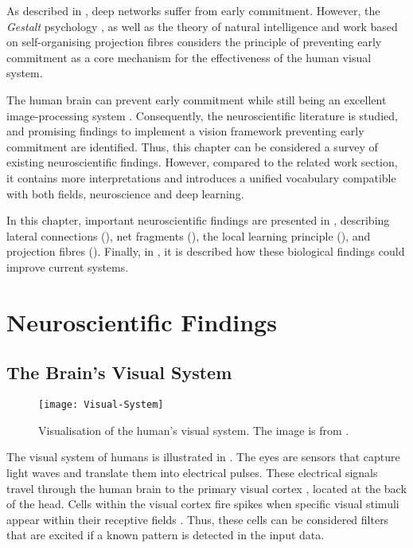 As described in , deep networks suffer from early commitment.
However, the \emph{Gestalt} psychology \cite{ellis_source_1938, kohler_gestalt_1992, wagemans_century_2012, hamlyn_psychology_2017}, as well as the theory of natural intelligence \cite{von_der_malsburg_theory_2022} and work based on self-organising projection fibres \cite{bienenstock_neural_1987, lades_distortion_1993, wiskott_face_1996, fernandes_self-organization_2015} considers the principle of preventing early commitment as a core mechanism for the effectiveness of the human visual system.

The human brain can prevent early commitment \cite{marr_vision_2010} while still being an excellent image-processing system \cite{ellis_source_1938, kohler_gestalt_1992, wagemans_century_2012, hamlyn_psychology_2017}. 
Consequently, the neuroscientific literature is studied, and promising findings to implement a vision framework preventing early commitment are identified.
Thus, this chapter can be considered a survey of existing neuroscientific findings.
However, compared to the related work section, it contains more interpretations and introduces a unified vocabulary compatible with both fields, neuroscience and deep learning.

In this chapter, important neuroscientific findings are presented in , describing lateral connections (), net fragments (), the local learning principle (), and projection fibres ().
Finally, in , it is described how these biological findings could improve current systems.



\section{Neuroscientific Findings}

\subsection{The Brain's Visual System}
\begin{figure}[h]
    \centering
    \texttt{[image: Visual-System]}
    \caption[Visualisation of the human's visual system]{Visualisation of the human's visual system. The image is from .}
\end{figure}
%
The visual system of humans is illustrated in . The eyes are sensors that capture light waves and translate them into electrical pulses. These electrical signals travel through the human brain to the primary visual cortex , located at the back of the head.
Cells within the visual cortex fire spikes when specific visual stimuli appear within their receptive fields \cite{grill-spector_human_2004}. Thus, these cells can be considered filters that are excited if a known pattern is detected in the input data. 

